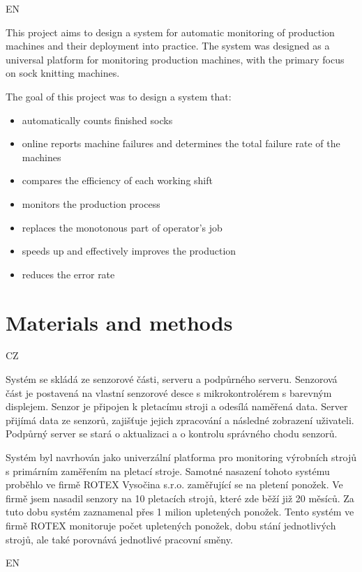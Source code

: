 \documentclass[12pt, a4paper]{article}
\begin{document}
EN

This project aims to design a system for automatic monitoring of production machines and their deployment into practice.
The system was designed as a universal platform for monitoring production machines, with the primary focus on sock knitting machines.

The goal of this project was to design a system that:

\begin{itemize}
    \item automatically counts finished socks
    \item online reports machine failures and determines the total failure rate of the machines
    \item compares the efficiency of each working shift
    \item monitors the production process
    \item replaces the monotonous part of operator’s job
    \item speeds up and effectively improves the production
    \item reduces the error rate
\end{itemize}


\section*{Materials and methods}
CZ

Systém se skládá ze senzorové části, serveru a podpůrného serveru.
Senzorová část je postavená na vlastní senzorové desce s mikrokontrolérem s barevným displejem.
Senzor je připojen k pletacímu stroji a odesílá naměřená data.
Server přijímá  data ze senzorů, zajišťuje jejich zpracování a následné zobrazení uživateli.
Podpůrný server se stará o aktualizaci a o kontrolu správného chodu senzorů.

Systém byl navrhován jako univerzální platforma pro monitoring výrobních strojů s primárním zaměřením na pletací stroje.
Samotné nasazení tohoto systému proběhlo ve firmě ROTEX Vysočina s.r.o. zaměřující se na pletení ponožek.
Ve firmě jsem nasadil senzory na 10 pletacích strojů, které zde běží již 20 měsíců.
Za tuto dobu systém zaznamenal přes 1 milion upletených ponožek.
Tento systém ve firmě ROTEX monitoruje počet upletených ponožek, dobu stání jednotlivých strojů, ale také porovnává jednotlivé pracovní směny.

EN
\end{document}
